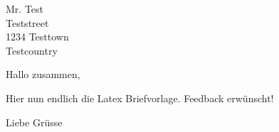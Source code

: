 \documentclass{scrlttr2}
\author{Alexander Dietmüller}
\begin{document}
\begin{letter}{%
    Mr. Test\\
    Teststreet\\
    1234 Testtown\\
    Testcountry%
}

\opening{Hallo zusammen,}

Hier nun endlich die Latex Briefvorlage. Feedback erwünscht!

\closing{Liebe Grüsse}


\end{letter}
\end{document}
